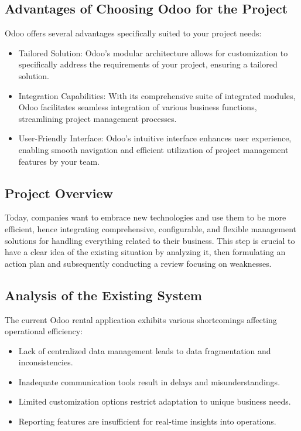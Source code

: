 \subsection{Advantages of Choosing Odoo for the Project}

Odoo offers several advantages specifically suited to your project needs:

\begin{itemize}
    \item Tailored Solution: Odoo's modular architecture allows for customization to specifically address the requirements of your project, ensuring a tailored solution.
    
    \item Integration Capabilities: With its comprehensive suite of integrated modules, Odoo facilitates seamless integration of various business functions, streamlining project management processes.
    
    \item User-Friendly Interface: Odoo's intuitive interface enhances user experience, enabling smooth navigation and efficient utilization of project management features by your team.
\end{itemize}


\subsection{Project Overview}

Today, companies want to embrace new technologies and use them to be more efficient, hence integrating comprehensive, configurable, and flexible management solutions for handling everything related to their business. This step is crucial to have a clear idea of the existing situation by analyzing it, then formulating an action plan and subsequently conducting a review focusing on weaknesses.

\subsection{Analysis of the Existing System}

The current Odoo rental application exhibits various shortcomings affecting operational efficiency:
\begin{itemize}
    \item Lack of centralized data management leads to data fragmentation and inconsistencies.
    \item Inadequate communication tools result in delays and misunderstandings.
    \item Limited customization options restrict adaptation to unique business needs.
    \item Reporting features are insufficient for real-time insights into operations.
\end{itemize}

